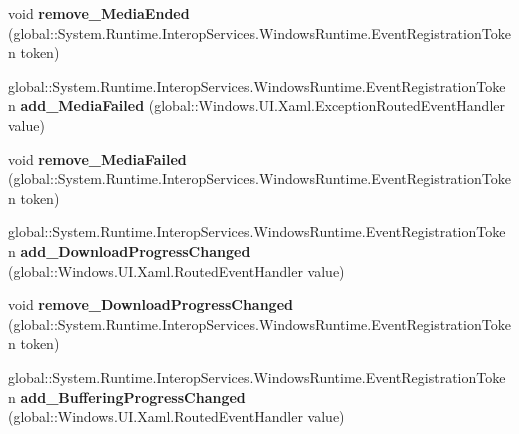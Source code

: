 \begin{DoxyCompactItemize}
void {\bfseries remove\+\_\+\+Media\+Ended} (global\+::\+System.\+Runtime.\+Interop\+Services.\+Windows\+Runtime.\+Event\+Registration\+Token token)
\item 
\mbox{\label{class_windows_1_1_u_i_1_1_xaml_1_1_controls_1_1_media_element_aed63a8c47ee93be1333407e7b09e4594}} 
global\+::\+System.\+Runtime.\+Interop\+Services.\+Windows\+Runtime.\+Event\+Registration\+Token {\bfseries add\+\_\+\+Media\+Failed} (global\+::\+Windows.\+U\+I.\+Xaml.\+Exception\+Routed\+Event\+Handler value)
\item 
\mbox{\label{class_windows_1_1_u_i_1_1_xaml_1_1_controls_1_1_media_element_a22a64926578aa6a1496c7fe3f1f3dd97}} 
void {\bfseries remove\+\_\+\+Media\+Failed} (global\+::\+System.\+Runtime.\+Interop\+Services.\+Windows\+Runtime.\+Event\+Registration\+Token token)
\item 
\mbox{\label{class_windows_1_1_u_i_1_1_xaml_1_1_controls_1_1_media_element_a8050dc9cb01fd89c3bb3aaa30fce71e9}} 
global\+::\+System.\+Runtime.\+Interop\+Services.\+Windows\+Runtime.\+Event\+Registration\+Token {\bfseries add\+\_\+\+Download\+Progress\+Changed} (global\+::\+Windows.\+U\+I.\+Xaml.\+Routed\+Event\+Handler value)
\item 
\mbox{\label{class_windows_1_1_u_i_1_1_xaml_1_1_controls_1_1_media_element_af48fd901cd255c7b2f1ea0a9d21f9192}} 
void {\bfseries remove\+\_\+\+Download\+Progress\+Changed} (global\+::\+System.\+Runtime.\+Interop\+Services.\+Windows\+Runtime.\+Event\+Registration\+Token token)
\item 
\mbox{\label{class_windows_1_1_u_i_1_1_xaml_1_1_controls_1_1_media_element_a3b5145330cca79ed48d73975a1d80841}} 
global\+::\+System.\+Runtime.\+Interop\+Services.\+Windows\+Runtime.\+Event\+Registration\+Token {\bfseries add\+\_\+\+Buffering\+Progress\+Changed} (global\+::\+Windows.\+U\+I.\+Xaml.\+Routed\+Event\+Handler value)
\item 
\mbox{\label{class_windows_1_1_u_i_1_1_xaml_1_1_controls_1_1_media_element_a43685deb17b059f17c7f2151a44ba55d}} 

\end{DoxyCompactItemize}
